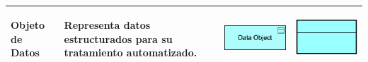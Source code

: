 \begin{longtable}{|p{0.15\linewidth}|p{0.45\linewidth}|p{0.2\linewidth} p{0.2\linewidth}|}
    
    Objeto de Datos 
    &
    Representa datos estructurados para su tratamiento automatizado. 
    &
\begin{center}
    \includegraphics[width=1\linewidth]{imgs/capa_aplicacion/aplication_dataObject.pdf}
\end{center} &
\begin{center}
    \includegraphics[width=0.7\linewidth]{imgs/capa_aplicacion/Data_object.pdf}
\end{center}
    \\ \hline
\end{longtable}